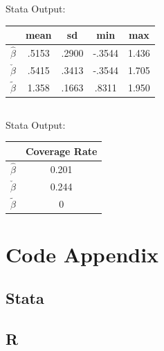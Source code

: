 \documentclass[12pt]{article}
\begin{document}
Stata Output:
\begin{tabular}{lcccc}
  \hline
&        mean&          sd&         min&         max\\
\hline
$\hat\beta$    &    .5153&    .2900&   -.3544&    1.436\\
$\check\beta$   &    .5415&    .3413&   -.3544&    1.705\\
$\tilde\beta$    &    1.358&    .1663&    .8311&    1.950\\
\hline
\end{tabular}


\subsection{}
Stata Output:

\begin{tabular}{lc}
  \hline
&        Coverage Rate \\
\hline
$\hat\beta$    &    0.201 \\
$\check\beta$   &     0.244 \\
$\tilde\beta$    &   0 \\
\hline
\end{tabular}



\newpage
\section{Code Appendix}
\tiny
\subsection*{Stata}
%
\subsection*{R}
%
%
%
\end{document}
